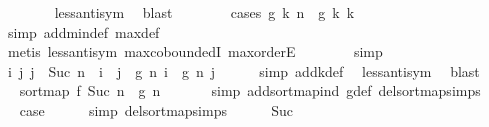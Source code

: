 \begin{isabellebody}
\ \ \ \ \ \ \isamarkupfalse%
\ less{\isacharunderscore}{\kern0pt}antisym\ \isamarkupfalse%
\ blast\isanewline
\ \ \ \ \ \ \isamarkupfalse%
\ {\isacharparenleft}{\kern0pt}cases\ {\isachardoublequoteopen}g\ k\ n\ {\isasymle}\ g\ k\ k{\isachardoublequoteclose}{\isacharparenright}{\kern0pt}\isanewline
\ \ \ \ \ \ \ \isamarkupfalse%
\ {\isacharparenleft}{\kern0pt}simp\ add{\isacharcolon}{\kern0pt}min{\isacharunderscore}{\kern0pt}def\ max{\isacharunderscore}{\kern0pt}def{\isacharparenright}{\kern0pt}\isanewline
\ \ \ \ \ \ \ \isamarkupfalse%
\ {\isacharparenleft}{\kern0pt}metis\ less{\isacharunderscore}{\kern0pt}antisym\ max{\isachardot}{\kern0pt}coboundedI{}\ max{\isachardot}{\kern0pt}orderE{\isacharparenright}{\kern0pt}\isanewline
\ \ \ \ \ \ \isamarkupfalse%
\ simp\isanewline
\ \ \isamarkupfalse%
\isanewline
\isanewline
\ \ \isamarkupfalse%
\ {\isachardoublequoteopen}{\isasymAnd}i\ j{\isachardot}{\kern0pt}\ j\ {\isacharless}{\kern0pt}\ Suc\ n\ {\isasymLongrightarrow}\ i\ {\isacharless}{\kern0pt}\ j\ {\isasymLongrightarrow}\ g\ n\ i\ {\isasymle}\ g\ n\ j{\isachardoublequoteclose}\isanewline
\ \ \ \ \isamarkupfalse%
\ {\isacharparenleft}{\kern0pt}simp\ add{\isacharcolon}{\kern0pt}k{\isacharunderscore}{\kern0pt}def{\isacharparenright}{\kern0pt}\ \isamarkupfalse%
\ less{\isacharunderscore}{\kern0pt}antisym\ \isamarkupfalse%
\ blast\isanewline
\ \ \isamarkupfalse%
\ \isamarkupfalse%
\ {\isachardoublequoteopen}sort{\isacharunderscore}{\kern0pt}map\ f\ {\isacharparenleft}{\kern0pt}Suc\ n{\isacharparenright}{\kern0pt}\ {\isacharequal}{\kern0pt}\ g\ n{\isachardoublequoteclose}\ \isanewline
\ \ \ \ \isamarkupfalse%
\ {\isacharparenleft}{\kern0pt}simp\ add{\isacharcolon}{\kern0pt}sort{\isacharunderscore}{\kern0pt}map{\isacharunderscore}{\kern0pt}ind\ g{\isacharunderscore}{\kern0pt}def\ del{\isacharcolon}{\kern0pt}sort{\isacharunderscore}{\kern0pt}map{\isachardot}{\kern0pt}simps{\isacharparenright}{\kern0pt}\isanewline
\ \ \isamarkupfalse%
\ \isamarkupfalse%
\ {\isacharquery}{\kern0pt}case\isanewline
\ \ \ \ \isamarkupfalse%
\ {\isacharparenleft}{\kern0pt}simp\ del{\isacharcolon}{\kern0pt}sort{\isacharunderscore}{\kern0pt}map{\isachardot}{\kern0pt}simps{\isacharparenright}{\kern0pt}\isanewline
\ \ \ \ \isamarkupfalse%
\ Suc\ \isamarkupfalse%

\end{isabellebody}
